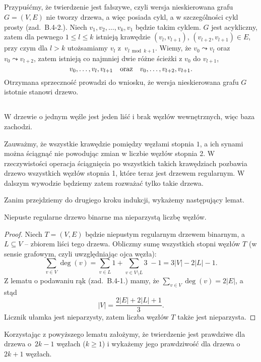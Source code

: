 \subsection{} %
Przypuśćmy, że twierdzenie jest fałszywe, czyli wersja nieskierowana grafu $G=(V,E)$ nie tworzy drzewa, a więc posiada cykl, a w szczególności cykl prosty (zad.~B.4-2.). Niech $v_1,v_2,\dots,v_k,v_1$ będzie takim cyklem. $G$ jest acykliczny, zatem dla pewnego $1\le l\le k$ istnieją krawędzie $(v_l,v_{l+1})$, $(v_{l+2},v_{l+1})\in E$, przy czym dla $l>k$ utożsamiamy $v_l$ z~$v_{l\bmod k+1}$. Wiemy, że $v_0\leadsto v_l$ oraz $v_0\leadsto v_{l+2}$, zatem istnieją co najmniej dwie różne ścieżki z $v_0$ do $v_{l+1}$,
\[
	v_0,\dots,v_l,v_{l+1}\quad\hbox{oraz}\quad v_0,\dots,v_{l+2},v_{l+1}.
\]
Otrzymana sprzeczność prowadzi do wniosku, że wersja nieskierowana grafu $G$ istotnie stanowi drzewo.

\subsection{} %
W drzewie o jednym węźle jest jeden liść i brak węzłów wewnętrznych, więc baza zachodzi.

Zauważmy, że wszystkie krawędzie pomiędzy węzłami stopnia $1$, a ich synami można ściągnąć nie powodując zmian w liczbie węzłów stopnia 2. W rzeczywistości operacja ściągnięcia po wszystkich takich krawędziach pozbawia drzewo wszystkich węzłów stopnia 1, które teraz jest drzewem regularnym. W dalszym wywodzie będziemy zatem rozważać tylko takie drzewa.

Zanim przejdziemy do drugiego kroku indukcji, wykażemy następujący lemat.
\begin{lemat*}
	Niepuste regularne drzewo binarne ma nieparzystą liczbę węzłów.
\end{lemat*}
\begin{proof}
Niech $T=(V,E)$ będzie niepustym regularnym drzewem binarnym, a~$L\subseteq V$ -- zbiorem liści tego drzewa. Obliczmy sumę wszystkich stopni węzłów $T$ (w sensie grafowym, czyli uwzględniając ojca węzła):
\[
	\sum_{v\in V}\deg(v) = \sum_{v\in L}1+\sum_{v\in V\setminus L}\!\!\!3\;-1=3|V|-2|L|-1.
\]
Z lematu o podawaniu rąk (zad.~B.4-1.) mamy, że $\sum_{v\in V}\deg(v) = 2|E|$, a stąd
\[
	|V| = \frac{2|E|+2|L|+1}{3}.
\]
Licznik ułamka jest nieparzysty, zatem liczba węzłów $T$ także jest nieparzysta.

\end{proof}

Korzystając z powyższego lematu założymy, że twierdzenie jest prawdziwe dla drzewa o~$2k-1$ węzłach ($k\ge1$) i wykażemy jego prawdziwość dla drzewa o $2k+1$ węzłach.

